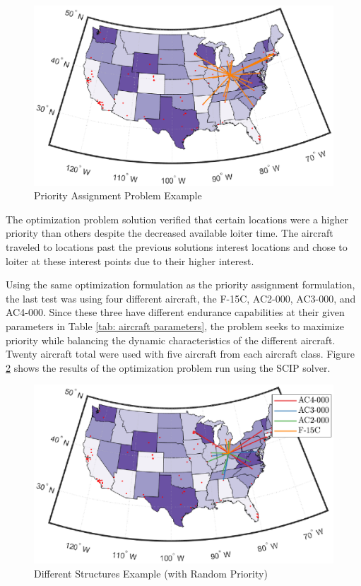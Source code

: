 \begin{figure}[H]
    \centering
    \includegraphics{Thesis/Method_II/priorityAP.eps}
    \caption{Priority Assignment Problem Example}
    \label{fig:priorityAP}
\end{figure}
The optimization problem solution verified that certain locations were a higher priority than others despite the decreased available loiter time. The aircraft traveled to locations past the previous solutions interest locations and chose to loiter at these interest points due to their higher interest.\par
Using the same optimization formulation as the priority assignment formulation, the last test was using four different aircraft, the F-15C, AC2-000, AC3-000, and AC4-000. Since these three have different endurance capabilities at their given parameters in Table \ref{tab: aircraft parameters}, the problem seeks to maximize priority while balancing the dynamic characteristics of the different aircraft. Twenty aircraft total were used with five aircraft from each aircraft class. Figure \ref{fig:diffStructuresAP} shows the results of the optimization problem run using the SCIP solver.
\begin{figure}[H]
    \centering
    \includegraphics{Thesis/Method_II/diffStructuresAP.eps}
    \caption{Different Structures Example (with Random Priority)}
    \label{fig:diffStructuresAP}
\end{figure}
